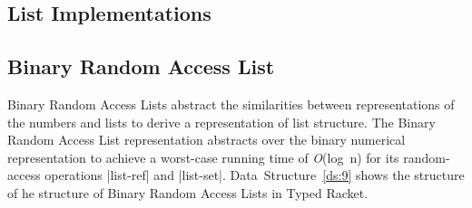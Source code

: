 
\subsection{List Implementations}

% 
% 

\subsection*{Binary Random Access List}
Binary Random Access Lists abstract the similarities between
representations of the numbers and lists to derive a representation of
list structure. The Binary Random Access List representation abstracts
over the binary numerical representation \citep{oka} to achieve a
worst-case running time of \emph{O}(log~n) for its random-access
operations \scheme|list-ref| and
\scheme|list-set|. Data~Structure~\ref{ds:9} shows the structure of he
structure of Binary Random Access Lists in Typed Racket.

